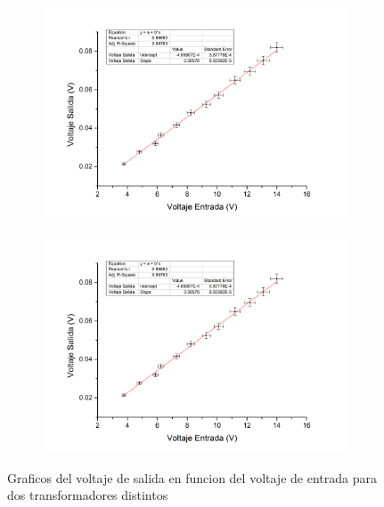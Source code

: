 \documentclass[11pt,a4paper]{article}
\begin{document}
\begin{figure}[H]
	\begin{subfigure}{0.5\textwidth}
		\centering
		\includegraphics[scale=0.35]{Bobina_1600_400}
		\label{subfig:1600_400}
	\end{subfigure}
	\begin{subfigure}{0.5\textwidth}
		\centering
		\includegraphics[scale=0.35]{Bobina_1600_400}
		\label{subfig:800_200}
	\end{subfigure}
	\caption{Graficos del voltaje de salida en funcion del voltaje de entrada para dos transformadores distintos}
\end{figure}
\end{document}
